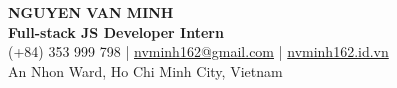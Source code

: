 \begin{center}
    {\fontsize{25}{28}\selectfont\bfseries NGUYEN VAN MINH}\\[4pt]
    {\large\bfseries Full-stack JS Developer Intern}\\[6pt]
    \small (+84) 353 999 798 \;|\; \href{mailto:nvminh162@gmail.com}{nvminh162@gmail.com} \;|\; \href{https://nvminh162.id.vn}{nvminh162.id.vn}\\[3pt]
    \small An Nhon Ward, Ho Chi Minh City, Vietnam
    \\ \vspace{-1pt}
\end{center}
